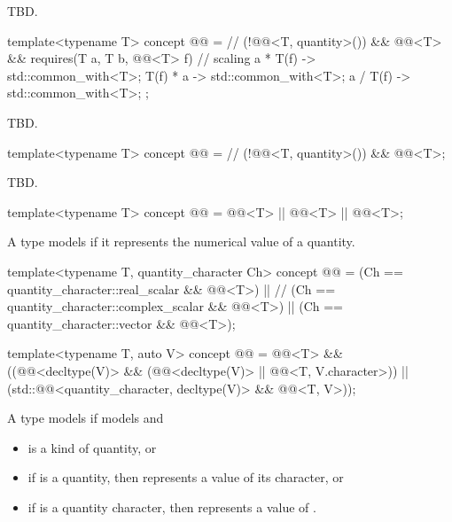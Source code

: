 \pnum
TBD.

\begin{itemdecl}
template<typename T>
concept @@ =  // \expos
  (!@@<T, quantity>()) && @@<T> &&
  requires(T a, T b, @@<T> f) {
    // scaling
    { a * T(f) } -> std::common_with<T>;
    { T(f) * a } -> std::common_with<T>;
    { a / T(f) } -> std::common_with<T>;
  };
\end{itemdecl}

\pnum
TBD.

\begin{itemdecl}
template<typename T>
concept @@ =  // \expos
  (!@@<T, quantity>()) && @@<T>;
\end{itemdecl}

\pnum
TBD.

\begin{itemdecl}
template<typename T>
concept @@ = @@<T> || @@<T> ||
                         @@<T>;
\end{itemdecl}

\pnum
A type  models  if
it represents the numerical value of a quantity.

\begin{itemdecl}
template<typename T, quantity_character Ch>
concept @@ = (Ch == quantity_character::real_scalar && @@<T>) ||  // \expos
                        (Ch == quantity_character::complex_scalar && @@<T>) ||
                        (Ch == quantity_character::vector && @@<T>);

template<typename T, auto V>
concept @@ =
  @@<T> && ((@@<decltype(V)> &&
                         (@@<decltype(V)> || @@<T, V.character>)) ||
                        (std::@@<quantity_character, decltype(V)> && @@<T, V>));
\end{itemdecl}

\pnum
A type  models  if
 models  and
\begin{itemize}
\item
{} is a kind of quantity, or
\item
if  is a quantity, then  represents a value of its character, or
\item
if  is a quantity character, then  represents a value of .
\end{itemize}

